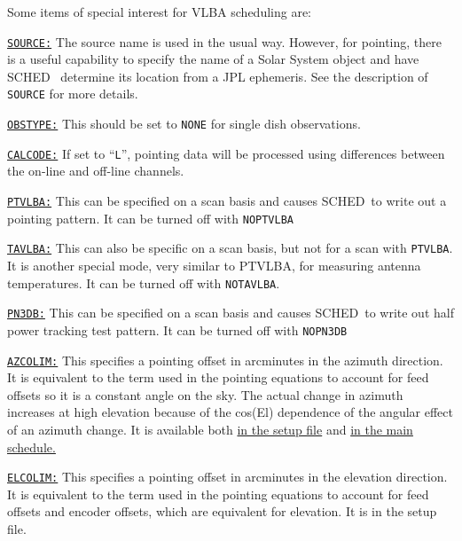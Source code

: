 \documentclass{report}
\newcommand{\schedb}{{\sc SCHED~}}
\begin{document}
Some items of special interest for VLBA scheduling are:
\begin{list}{}{\parsep 0em  \itemsep 0em }

\item 
{\hyperref[MP:SOURCE]{{\tt SOURCE:}}} The source name is used in
the usual way.  However, for pointing, there is a useful capability
to specify the name of a Solar System object and have \schedb
determine its location from a JPL ephemeris.  See the description
of {\tt SOURCE} for more details.

\item 
{\hyperref[MP:OBSTYPE]{{\tt OBSTYPE:}}} This should be set to
{\tt NONE} for single dish observations.

\item 
{\hyperref[SEC:SRCCAT]{{\tt CALCODE:}}} If set to ``{\tt L}'',
pointing data will be processed using differences between the
on-line and off-line channels.

\item 
{\hyperref[MP:PTVLBA]{{\tt PTVLBA:}}} This can be specified on a
scan basis and causes \schedb to write out a pointing pattern.  It can
be turned off with {\tt NOPTVLBA}

\item 
{\hyperref[MP:TAVLBA]{{\tt TAVLBA:}}} This can also be specific
on a scan basis, but not for a scan with {\tt PTVLBA}.  It is another
special mode, very similar to PTVLBA, for measuring antenna
temperatures.  It can be turned off with {\tt NOTAVLBA}.

\item 
{\hyperref[MP:PN3DB]{{\tt PN3DB:}}} This can be specified on a
scan basis and causes \schedb to write out half power tracking test
pattern.  It can be turned off with {\tt NOPN3DB}

\item 
{\hyperref[SP:AZCOLIM]{{\tt AZCOLIM:}}} This specifies a pointing
offset in arcminutes in the azimuth direction.  It is equivalent to
the term used in the pointing equations to account for feed offsets
so it is a constant angle on the sky.  The actual change in azimuth
increases at high elevation because of the cos(El) dependence of
the angular effect of an azimuth change.  It is available both
{\hyperref[SP:AZCOLIM]{in the setup file}} and 
{\hyperref[MP:AZCOLIM]{in the main schedule.}}

\item 
{\hyperref[SP:ELCOLIM]{{\tt ELCOLIM:}}} This specifies a pointing
offset in arcminutes in the elevation direction.  It is equivalent to
the term used in the pointing equations to account for feed offsets
and encoder offsets, which are equivalent for elevation.  It is in
the setup file.


\end{list}
\end{document}
